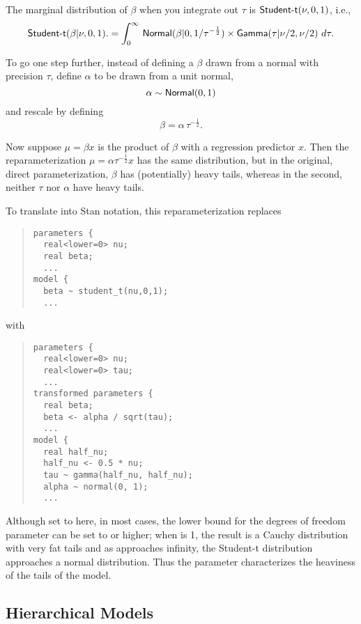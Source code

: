 The marginal distribution of $\beta$ when you integrate out $\tau$ is
$\mbox{\sf Student-t}(\nu, 0, 1)$, i.e.,
\[
\mbox{\sf Student-t}(\beta | \nu,0,1).
= 
\int_0^{\infty} 
\,
\mbox{\sf Normal}(\beta | 0, 1 / \tau^{-\frac{1}{2}})
\times
\mbox{\sf Gamma}(\tau | \nu/2, \nu/2)
\
d\tau.
\]
%

To go one step further, instead of defining a $\beta$ drawn from a
normal with precision $\tau$, define $\alpha$ to be drawn from a unit
normal,
%
\[
\alpha \sim \mbox{\sf Normal}(0,1)
\]
%
and rescale by defining
%
\[
\beta = \alpha \, \tau^{-\frac{1}{2}}.
\]
%

Now suppose $\mu = \beta x$ is the product of $\beta$ with a
regression predictor $x$.  Then the reparameterization $\mu = \alpha
\tau^{-\frac{1}{2}} x$ has the same distribution, but in the original, direct
parameterization, $\beta$ has (potentially) heavy tails, whereas in
the second, neither $\tau$ nor $\alpha$ have heavy tails.

To translate into Stan notation, this reparameterization replaces
%
\begin{quote}
\begin{Verbatim}
parameters {
  real<lower=0> nu;
  real beta;
  ...
model {
  beta ~ student_t(nu,0,1);
  ...
\end{Verbatim}
\end{quote}
%
with
%
\begin{quote}
\begin{Verbatim}
parameters {
  real<lower=0> nu;
  real<lower=0> tau;
  ...
transformed parameters {
  real beta;
  beta <- alpha / sqrt(tau);
  ...
model {
  real half_nu;
  half_nu <- 0.5 * nu;
  tau ~ gamma(half_nu, half_nu);
  alpha ~ normal(0, 1);
  ...
\end{Verbatim}
\end{quote}  
%
Although set to  here, in most cases, the lower bound for the
degrees of freedom parameter  can be set to \code{1} or
higher; when  is 1, the result is a Cauchy distribution with
very fat tails and as  approaches infinity, the Student-t
distribution approaches a normal distribution.  Thus the parameter
\code{nu} characterizes the heaviness of the tails of the model.

\subsection{Hierarchical Models}

